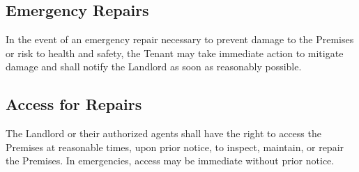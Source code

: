\subsection{Emergency Repairs}
\label{sec:emergencyrepairs}
In the event of an emergency repair necessary to prevent damage to the Premises or risk to health and safety, the Tenant may take immediate action to mitigate damage and shall notify the Landlord as soon as reasonably possible.

\subsection{Access for Repairs}
\label{sec:accessforrepairs}
The Landlord or their authorized agents shall have the right to access the Premises at reasonable times, upon prior notice, to inspect, maintain, or repair the Premises. In emergencies, access may be immediate without prior notice.

